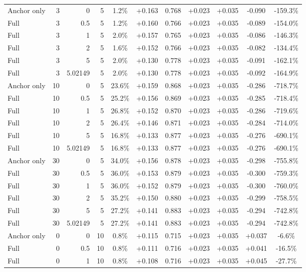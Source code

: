 \begin{table}[htbp]
\begin{tabular}{lrrrccccccc}
Anchor only & 3 & 0 & 5 & 1.2\% & +0.163 & 0.768 & +0.023 & +0.035 & -0.090 & -159.3\% \\
Full & 3 & 0.5 & 5 & 1.2\% & +0.160 & 0.766 & +0.023 & +0.035 & -0.089 & -154.0\% \\
Full & 3 & 1 & 5 & 2.0\% & +0.157 & 0.765 & +0.023 & +0.035 & -0.086 & -146.3\% \\
Full & 3 & 2 & 5 & 1.6\% & +0.152 & 0.766 & +0.023 & +0.035 & -0.082 & -134.4\% \\
Full & 3 & 5 & 5 & 2.0\% & +0.130 & 0.778 & +0.023 & +0.035 & -0.091 & -162.1\% \\
Full & 3 & 5.02149 & 5 & 2.0\% & +0.130 & 0.778 & +0.023 & +0.035 & -0.092 & -164.9\% \\
Anchor only & 10 & 0 & 5 & 23.6\% & +0.159 & 0.868 & +0.023 & +0.035 & -0.286 & -718.7\% \\
Full & 10 & 0.5 & 5 & 25.2\% & +0.156 & 0.869 & +0.023 & +0.035 & -0.285 & -718.4\% \\
Full & 10 & 1 & 5 & 26.8\% & +0.152 & 0.870 & +0.023 & +0.035 & -0.286 & -719.6\% \\
Full & 10 & 2 & 5 & 26.4\% & +0.146 & 0.871 & +0.023 & +0.035 & -0.284 & -714.0\% \\
Full & 10 & 5 & 5 & 16.8\% & +0.133 & 0.877 & +0.023 & +0.035 & -0.276 & -690.1\% \\
Full & 10 & 5.02149 & 5 & 16.8\% & +0.133 & 0.877 & +0.023 & +0.035 & -0.276 & -690.1\% \\
Anchor only & 30 & 0 & 5 & 34.0\% & +0.156 & 0.878 & +0.023 & +0.035 & -0.298 & -755.8\% \\
Full & 30 & 0.5 & 5 & 36.0\% & +0.153 & 0.879 & +0.023 & +0.035 & -0.300 & -759.3\% \\
Full & 30 & 1 & 5 & 36.0\% & +0.152 & 0.879 & +0.023 & +0.035 & -0.300 & -760.0\% \\
Full & 30 & 2 & 5 & 35.2\% & +0.150 & 0.880 & +0.023 & +0.035 & -0.299 & -758.5\% \\
Full & 30 & 5 & 5 & 27.2\% & +0.141 & 0.883 & +0.023 & +0.035 & -0.294 & -742.8\% \\
Full & 30 & 5.02149 & 5 & 27.2\% & +0.141 & 0.883 & +0.023 & +0.035 & -0.294 & -742.8\% \\
Anchor only & 0 & 0 & 10 & 0.8\% & +0.115 & 0.715 & +0.023 & +0.035 & +0.037 & -6.6\% \\
Full & 0 & 0.5 & 10 & 0.8\% & +0.111 & 0.716 & +0.023 & +0.035 & +0.041 & -16.5\% \\
Full & 0 & 1 & 10 & 0.8\% & +0.108 & 0.716 & +0.023 & +0.035 & +0.045 & -27.7\% \\

\end{tabular}
\end{table}
